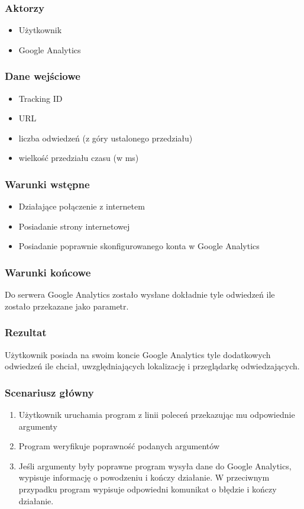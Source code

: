 \documentclass{article}
\begin{document}
\subsubsection{Aktorzy}
\begin{itemize}
\item Użytkownik
\item Google Analytics
\end{itemize}

\subsubsection{Dane wejściowe}
\begin{itemize}
\item Tracking ID
\item URL
\item liczba odwiedzeń (z góry ustalonego przedziału)
\item wielkość przedziału czasu (w ms)
\end{itemize}

\subsubsection{Warunki wstępne}
\begin{itemize}
\item Działające połączenie z internetem
\item Posiadanie strony internetowej
\item Posiadanie poprawnie skonfigurowanego konta w Google Analytics
\end{itemize}

\subsubsection{Warunki końcowe}
Do serwera Google Analytics zostało wysłane dokładnie tyle odwiedzeń ile zostało przekazane jako parametr.

\subsubsection{Rezultat}
Użytkownik posiada na swoim koncie Google Analytics tyle dodatkowych odwiedzeń ile chciał, uwzględniających lokalizację i przeglądarkę odwiedzających.

\subsubsection{Scenariusz główny}
\begin{enumerate}
\item Użytkownik uruchamia program z linii poleceń przekazując mu odpowiednie argumenty
\item Program weryfikuje poprawność podanych argumentów
\item Jeśli argumenty były poprawne program wysyła dane do Google Analytics, wypisuje informację o powodzeniu i kończy działanie. W przeciwnym przypadku program wypisuje odpowiedni komunikat o błędzie i kończy działanie.
\end{enumerate}
\end{document}
